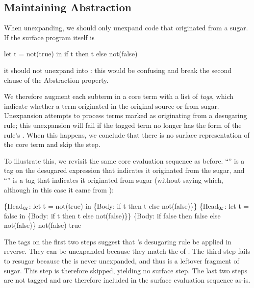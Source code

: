 \subsection{Maintaining Abstraction}
\label{sec:reval-exposition-tagging}

When unexpanding, we should only unexpand code that
originated from a sugar. If the surface program itself is
\begin{Codes}
let t = not(true) in
  if t then t else not(false)
\end{Codes}
it should not unexpand into :
this would be confusing and break the second clause of the Abstraction property.

We therefore augment each subterm in a core term
with a list of \emph{tags}, which indicate whether a term
originated in the original source or from sugar.%
Unexpansion attempts to process terms marked as
originating from a desugaring rule; this
unexpansion will fail if the tagged term no longer has the form of
the rule's . When this happens, we conclude that there is no
surface representation of the core term and skip the step.

To illustrate this, we revisit the same core evaluation sequence as
before. \newline %
``'' is a tag on the desugared expression that
indicates it originated from the  sugar, and ``''
is a tag that indicates it originated from sugar (without saying
which, although in this case it came from ):
\begin{Codes}
    \{Head\(\sb{\texttt{Or}}\): let t = not(true) in
      \{Body: if t then t else not(false)\}\}
\CoreStep \{Head\(\sb{\texttt{Or}}\): let t = false in
      \{Body: if t then t else not(false)\}\}
\CoreStep \{Body: if false then false else not(false)\}
\CoreStep not(false)
\CoreStep true
\end{Codes}
The tags on the first two steps suggest that 's
desugaring rule be applied in reverse. They can be unexpanded
because they match the  of . The third step fails to
resugar because the  is never unexpanded, and thus is a
leftover fragment of sugar. This step is therefore skipped, yielding no
surface step. The last two steps are not tagged and are
therefore included in the surface evaluation sequence as-is.

